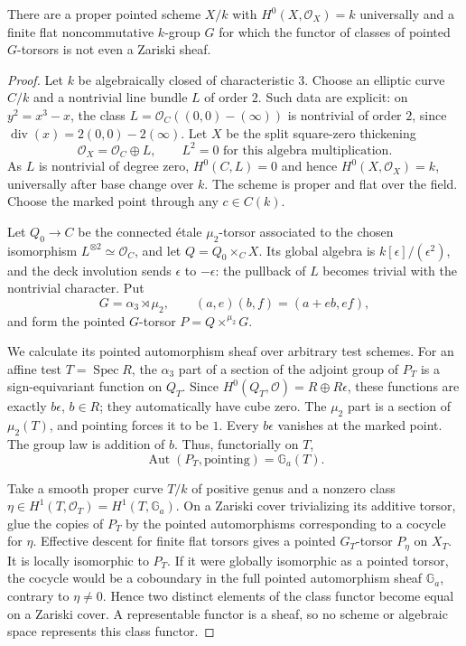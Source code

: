 \begin{proposition}
\label{C:non-sheaf}
There are a proper pointed scheme $X/k$ with
$H^0(X,\mathcal O_X)=k$ universally and a finite flat noncommutative
$k$-group $G$ for which the functor of classes of pointed $G$-torsors
is not even a Zariski sheaf.
\end{proposition}

\begin{proof}
Let $k$ be algebraically closed of characteristic $3$.  Choose an
elliptic curve $C/k$ and a nontrivial line bundle $L$ of order $2$.
Such data are explicit: on $y^2=x^3-x$, the class
$L=\mathcal O_C((0,0)-(\infty))$ is nontrivial of order $2$, since
$\operatorname{div}(x)=2(0,0)-2(\infty)$.
Let $X$ be the split square-zero thickening
\[
\mathcal O_X=\mathcal O_C\oplus L,\qquad L^2=0
\text{ for this algebra multiplication}.
\]
As $L$ is nontrivial of degree zero,
$H^0(C,L)=0$ and hence $H^0(X,\mathcal O_X)=k$, universally after
base change over $k$.  The scheme is proper and flat over the field.
Choose the marked point through any $c\in C(k)$.

Let $Q_0\to C$ be the connected \'etale $\mu_2$-torsor associated
to the chosen isomorphism $L^{\otimes2}\simeq\mathcal O_C$, and let
$Q=Q_0\times_C X$.  Its global algebra is
$k[\epsilon]/(\epsilon^2)$, and the deck involution sends
$\epsilon$ to $-\epsilon$: the pullback of $L$ becomes trivial
with the nontrivial character.  Put
\[
G=\alpha_3\rtimes\mu_2,
\qquad (a,e)(b,f)=(a+eb,ef),
\]
and form the pointed $G$-torsor $P=Q\mathbin{\times^{\mu_2}}G$.

We calculate its pointed automorphism sheaf over arbitrary test
schemes.  For an affine test $T=\operatorname{Spec}R$, the
$\alpha_3$ part of a section of the adjoint group of $P_T$ is a
sign-equivariant function on $Q_T$.  Since
$H^0(Q_T,\mathcal O)=R\oplus R\epsilon$, these functions are
exactly $b\epsilon$, $b\in R$; they automatically have cube zero.
The $\mu_2$ part is a section of $\mu_2(T)$, and pointing forces it
to be $1$.  Every $b\epsilon$ vanishes at the marked point.  The
group law is addition of $b$.  Thus, functorially on $T$,
\[
\operatorname{Aut}(P_T,\text{pointing})=\mathbb G_a(T).
\]

Take a smooth proper curve $T/k$ of positive genus and a nonzero
class $\eta\in H^1(T,\mathcal O_T)=H^1(T,\mathbb G_a)$.
On a Zariski cover trivializing its additive torsor, glue the copies
of $P_T$ by the pointed automorphisms corresponding to a cocycle for
$\eta$.  Effective descent for finite flat torsors gives a pointed
$G_T$-torsor $P_\eta$ on $X_T$.  It is locally isomorphic to $P_T$.
If it were globally isomorphic as a pointed torsor, the cocycle
would be a coboundary in the full pointed automorphism sheaf
$\mathbb G_a$, contrary to $\eta\ne0$.  Hence two distinct elements
of the class functor become equal on a Zariski cover.  A representable
functor is a sheaf, so no scheme or algebraic space represents this
class functor.
\end{proof}

